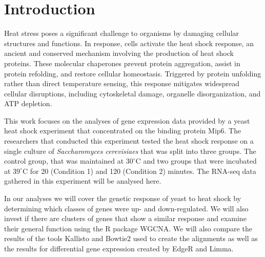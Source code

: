\chapter{Introduction}
Heat stress poses a significant challenge to organisms by damaging cellular 
structures and functions. In response, cells activate the heat shock response, 
an ancient and conserved mechanism involving the production of heat shock proteins. 
These molecular chaperones prevent protein aggregation, assist in protein refolding, 
and restore cellular homeostasis. Triggered by protein unfolding rather than direct 
temperature sensing, this response mitigates widespread cellular disruptions, 
including cytoskeletal damage, organelle disorganization, and ATP depletion. 
\cite{richter_heat_2010}

This work focuses on the analyses of gene expression data provided by a yeast 
heat shock experiment that concentrated 
on the binding protein Mip6. The researchers 
that conducted this experiment tested the heat shock response on a single 
culture of \textit{Saccharomyces cerevisiaes} that was split into three groups. 
The control group, that was maintained at $30^\circ\text{C}$ and two groups 
that were incubated at $39^\circ\text{C}$ for 20 (Condition 1) and 120 (Condition 2)
minutes. The RNA-seq data gathered in this experiment will be analysed here. 
\cite{nuno-cabanes_multi-omics_2020}

In our analyses we will cover the genetic response of yeast to heat shock by 
determining which classes of genes were up- and down-regulated. We will also 
invest if there are clusters of genes that show a similar response and examine 
their general function using the R package WGCNA. We will also compare the results 
of the tools Kallisto and Bowtie2 used to create the alignments as well as the 
results for differential gene expression created by EdgeR and Limma.

